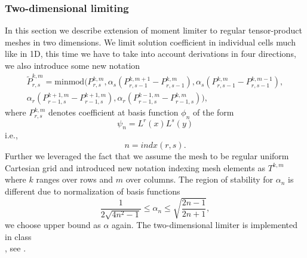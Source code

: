 \subsubsection{Two-dimensional limiting}
In this section we describe extension of moment limiter to regular 
tensor-product meshes in two dimensions. We limit solution coefficient in 
individual cells much like in 1D, this time we have to take into account 
derivations in four directions, we also introduce some new notation
\begin{multline}
\tilde{P}^{k,m}_{r,s} =
    \text{minmod}\big(P^{k,m}_{r,s}, 
                      \alpha_s(P^{k,m+1}_{r,s-1} - P^{k,m}_{r,s-1}),
                      \alpha_s(P^{k,m}_{r,s-1} - P^{k,m-1}_{r,s-1}),\\
                      \alpha_r(P^{k+1,m}_{r-1,s} - P^{k+1,m}_{r-1,s}),
                      \alpha_r(P^{k-1,m}_{r-1,s} - P^{k,m}_{r-1,s})\big),
\end{multline}
where $P^{k, m}_{r,s}$ denotes coefficient at basis function $\phi_n$ of the form
$$
\psi_n = L^r(x)L^s(y)
$$
i.e.,
$$
n = indx(r, s).
$$
Further we leveraged the fact that we assume the mesh to be regular uniform 
Cartesian grid and introduced new notation indexing mesh elements as $T^{k,m}$ where $k$ 
ranges over rows and $m$ over columns.
The region of stability for $\alpha_n$ is different due to normalization of 
basis functions
\begin{equation}
\frac{1}{2\sqrt{4n^2 - 1}} \leq \alpha_n \leq \sqrt{\frac{2n - 1}{2n + 1}},
\end{equation}
we choose upper bound as $\alpha$ again. The two-dimensional limiter is implemented in 
class\\ , see . 



